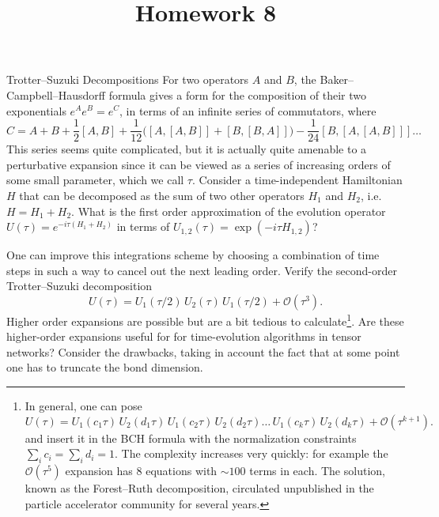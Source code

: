 \documentclass[a4paper,10pt,twoside]{article}
\def \order {\mathcal{O}}
\begin{document}
\title{\vspace{-1cm}\sffamily Homework 8\vspace{-1cm}}
\author{}
\date{}
\maketitle
\thispagestyle{fancy}

\begin{section}{Trotter--Suzuki Decompositions}
For two operators $A$ and $B$, the Baker--Campbell--Hausdorff formula gives a form for the composition of their two exponentials  $e^{A}e^{B} = e^{C}$, in terms of an infinite series of commutators, where 
\[
  C = A + B + \frac{1}{2}[A,B] + \frac{1}{12} \Big( [A,[A,B]] + [B,[B,A]] \Big) - \frac{1}{24} [B,[A,[A,B]]] \dots
\]
This series seems quite complicated, but it is actually quite amenable to a perturbative expansion since it can be viewed as a series of increasing orders of some small parameter, which we call $\tau$.
Consider a time-independent Hamiltonian $H$ that can be decomposed as the sum of two other operators $H_1$ and $H_2$, i.e. $H = H_1 + H_2$.
What is the first order approximation of the evolution operator $U(\tau) = e^{ -i\tau(H_1 + H_2)}$ in terms of $U_{1,2}(\tau) = \exp(-i \tau H_{1,2})$?

One can improve this integrations scheme by choosing a combination of time steps in such a way to cancel out the next leading order.
Verify the second-order Trotter--Suzuki decomposition
\[
  U(\tau) = U_1(\tau/2) \, U_2(\tau) \,U_1(\tau/2) + \order(\tau^3) .
\]
Higher order expansions are possible but are a bit tedious to calculate\footnote{In general, one can pose
\[
  U(\tau) = U_1(c_1 \tau) \, U_2(d_1 \tau) \, U_1(c_2 \tau) \, U_2(d_2 \tau) \dots \, U_1(c_k \tau) \, U_2(d_k\tau) + \order(\tau^{k+1}) .
\]
and insert it in the BCH formula with the normalization constraints $\sum_i c_i = \sum_i d_i = 1$.
The complexity increases very quickly: for example the $\order(\tau^5)$ expansion has 8 equations with $\sim 100$ terms in each. The solution, known as the Forest--Ruth decomposition, circulated unpublished in the particle accelerator community for several years.}.
Are these higher-order expansions useful for for time-evolution algorithms in tensor networks?
Consider the drawbacks, taking in account the fact that at some point one has to truncate the bond dimension.
\end{section}
\end{document}
